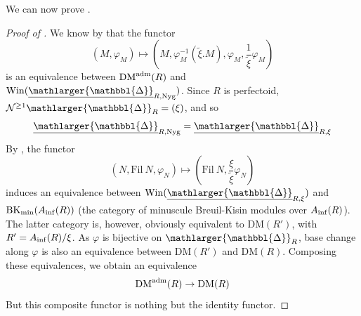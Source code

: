 \documentclass{amsart}
\newcommand{\prism}{{\mathlarger{\mathbbl{\Delta}}}}
\theoremstyle{plain}
\newtheorem{proposition}[theorem]{Proposition}
\theoremstyle{definition}
\newcommand{\Fil}{\mathrm{Fil}}
\newcommand{\tilxi}{\tilde{\xi}}
\newcommand{\DM}{\mathrm{DM}}
\newcommand{\olive}[1]{{\color{black}#1}}
\newcommand{\blue}[1]{{\color{black}#1}}
\begin{document}
%
We can now prove .

 \begin{proof}[Proof of ]
 We know by  that the functor
 $$
 (M, \varphi_M) \mapsto (M,\varphi_M^{-1}(\tilxi. M), \varphi_M, \frac{1}{\tilxi} \varphi_M) 
 $$
 is an equivalence between $\DM^{\rm adm}(R)$ and $\mathrm{Win}(\underline{\prism}_{R,\rm Nyg})$. Since $R$ is perfectoid, $\mathcal{N}^{\geq 1}\prism_R =(\xi)$, and so
 $$
 \underline{\prism}_{R,\rm Nyg} = \underline{\prism}_{R,\xi}
 $$
 By , the functor 
  \[ (N, \mathrm{Fil}~N, \varphi_N) \mapsto (\mathrm{Fil}~N, \frac{\xi}{\tilxi} \varphi_{N}) \]
induces an equivalence between $\mathrm{Win}( \underline{\prism}_{R,\xi})$ and \blue{$\mathrm{BK}_{\rm min}(A_{\rm inf}(R))$ (the category of minuscule Breuil-Kisin modules over $A_{\rm inf}(R)$). The latter category is, however, obviously equivalent to $\DM(R')$, with $R'=A_{\rm inf}(R) / \xi$.} As $\varphi$ is bijective on $\prism_R$, base change along $\varphi$ is also an equivalence between $\DM(R')$ and $\DM(R)$. Composing these equivalences, we obtain an equivalence
$$
\DM^{\rm adm}(R) \to \DM(R)
$$
But this composite functor is nothing but the identity functor. 
  \end{proof}
\end{document}
